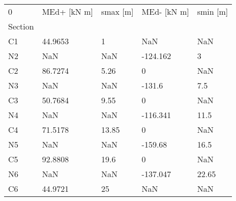 \begin{tabular}{lllll}
\toprule
0 & MEd+ [kN m] & smax [m] & MEd- [kN m] & smin [m] \\
Section &             &          &             &          \\
\midrule
C1      &     44.9653 &        1 &         NaN &      NaN \\
N2      &         NaN &      NaN &    -124.162 &        3 \\
C2      &     86.7274 &     5.26 &           0 &      NaN \\
N3      &         NaN &      NaN &      -131.6 &      7.5 \\
C3      &     50.7684 &     9.55 &           0 &      NaN \\
N4      &         NaN &      NaN &    -116.341 &     11.5 \\
C4      &     71.5178 &    13.85 &           0 &      NaN \\
N5      &         NaN &      NaN &     -159.68 &     16.5 \\
C5      &     92.8808 &     19.6 &           0 &      NaN \\
N6      &         NaN &      NaN &    -137.047 &    22.65 \\
C6      &     44.9721 &       25 &         NaN &      NaN \\
\bottomrule
\end{tabular}
